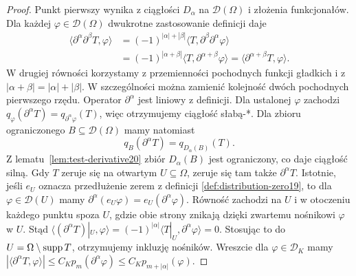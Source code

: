\begin{proof}
Punkt pierwszy wynika z ciągłości $D_\alpha$ na
$\mathcal D(\Omega)$ i złożenia funkcjonałów.
Dla każdej $\varphi\in\mathcal D(\Omega)$ dwukrotne
zastosowanie definicji daje
\[
\begin{aligned}
\langle\partial^\alpha\partial^\beta T,\varphi\rangle
&=(-1)^{|\alpha|+|\beta|}
  \langle T,\partial^\beta\partial^\alpha\varphi\rangle\\
&=(-1)^{|\alpha+\beta|}
  \langle T,\partial^{\alpha+\beta}\varphi\rangle
 =\langle\partial^{\alpha+\beta}T,\varphi\rangle.
\end{aligned}
\]
W drugiej równości korzystamy z przemienności pochodnych
funkcji gładkich i z $|\alpha+\beta|=|\alpha|+|\beta|$.
W szczególności można zamienić kolejność dwóch pochodnych
pierwszego rzędu. Operator $\partial^\alpha$ jest liniowy
z definicji.
Dla ustalonej $\varphi$ zachodzi
$q_\varphi(\partial^\alpha T)=q_{\partial^\alpha\varphi}(T)$,
więc otrzymujemy ciągłość słabą-*.
Dla zbioru ograniczonego $B\subseteq\mathcal D(\Omega)$
mamy natomiast
\[
 q_B(\partial^\alpha T)=q_{D_\alpha(B)}(T).
\]
Z lematu~\ref{lem:test-derivative20} zbiór $D_\alpha(B)$ jest
ograniczony, co daje ciągłość silną. Gdy $T$ zeruje się na
otwartym $U\subseteq\Omega$, zeruje się tam także $\partial^\alpha T$.
Istotnie, jeśli $e_U$ oznacza przedłużenie zerem z definicji
\ref{def:distribution-zero19}, to dla $\varphi\in\mathcal D(U)$
mamy $\partial^\alpha(e_U\varphi)=e_U(\partial^\alpha\varphi)$.
Równość zachodzi na $U$ i w otoczeniu każdego punktu
spoza $U$, gdzie obie strony znikają dzięki zwartemu nośnikowi
$\varphi$ w $U$. Stąd
$\langle(\partial^\alpha T)|_U,\varphi\rangle
=(-1)^{|\alpha|}\langle T|_U,\partial^\alpha\varphi\rangle=0$.
Stosując to do $U=\Omega\setminus\operatorname{supp} T$, otrzymujemy
inkluzję nośników.
Wreszcie dla $\varphi\in\mathcal D_K$ mamy
$|\langle\partial^\alpha T,\varphi\rangle|
\le C_Kp_m(\partial^\alpha\varphi)
\le C_Kp_{m+|\alpha|}(\varphi)$.
\end{proof}


